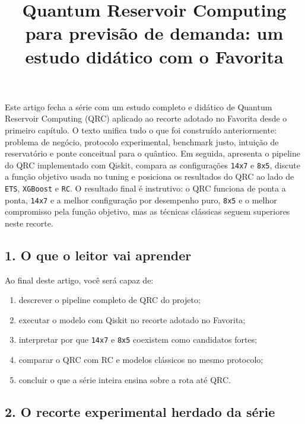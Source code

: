 \documentclass[12pt]{article}
\title{Quantum Reservoir Computing para previsão de demanda: um estudo didático com o Favorita}
\author{}
\providecommand{\tightlist}{%
  \setlength{\itemsep}{0pt}\setlength{\parskip}{0pt}}
\begin{document}
\maketitle

\begin{resumo}
Este artigo fecha a série com um estudo completo e didático de Quantum Reservoir Computing (QRC) aplicado ao recorte adotado no Favorita desde o primeiro capítulo. O texto unifica tudo o que foi construído anteriormente: problema de negócio, protocolo experimental, benchmark justo, intuição de reservatório e ponte conceitual para o quântico. Em seguida, apresenta o pipeline do QRC implementado com Qiskit, compara as configurações \texttt{14x7} e \texttt{8x5}, discute a função objetivo usada no tuning e posiciona os resultados do QRC ao lado de \texttt{ETS}, \texttt{XGBoost} e \texttt{RC}. O resultado final é instrutivo: o QRC funciona de ponta a ponta, \texttt{14x7} e a melhor configuração por desempenho puro, \texttt{8x5} e o melhor compromisso pela função objetivo, mas as técnicas clássicas seguem superiores neste recorte.
\end{resumo}

\subsection{1. O que o leitor vai aprender}\label{1-o-que-o-leitor-vai-aprender}

Ao final deste artigo, você será capaz de:

\begin{enumerate}
\def\labelenumi{\arabic{enumi}.}
\tightlist
\item
  descrever o pipeline completo de QRC do projeto;
\item
  executar o modelo com Qiskit no recorte adotado no Favorita;
\item
  interpretar por que \texttt{14x7} e \texttt{8x5} coexistem como candidatos fortes;
\item
  comparar o QRC com RC e modelos clássicos no mesmo protocolo;
\item
  concluir o que a série inteira ensina sobre a rota até QRC.
\end{enumerate}

\subsection{2. O recorte experimental herdado da série}\label{2-o-recorte-experimental-herdado-da-suxe9rie}
\end{document}
